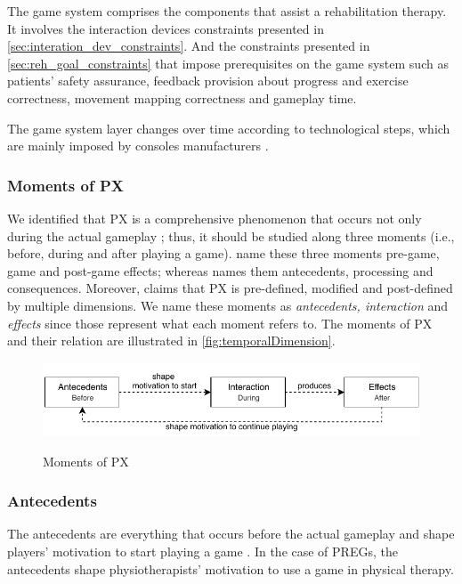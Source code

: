 The game system comprises the components that assist a rehabilitation therapy. It involves the interaction devices constraints presented in \autoref{sec:interation_dev_constraints}. And the constraints presented in \autoref{sec:reh_goal_constraints} that impose prerequisites on the game system such as patients' safety assurance, feedback provision about progress and exercise correctness, movement mapping correctness and gameplay time.

The game system layer changes over time according to technological steps, which are mainly imposed by consoles manufacturers \autocite{Nackea,Nackea2}.

\subsubsection{Moments of \ac{PX}}
We identified that \ac{PX} is a comprehensive phenomenon that occurs not only during the actual gameplay \autocite{Mayra}; thus, it should be studied along three moments \autocite{Elson2014,Fernandez2008,Nackea2,Nackea,Nacked} (i.e., before, during and after playing a game). \textcite{Elson2014} name these three moments pre-game, game and post-game effects; whereas \textcite{Fernandez2008} names them antecedents, processing and consequences. Moreover, \textcite{Mayra} claims that \ac{PX} is pre-defined, modified and post-defined by multiple dimensions. We name these moments as \textit{antecedents, interaction} and \textit{effects} since those represent what each moment refers to. The moments of \ac{PX} and their relation are illustrated in \autoref{fig:temporalDimension}.

\begin{figure}[bth]
\myfloatalign
{\includegraphics[width=.9\linewidth]{gfx/model/temporalDimension}} \quad
\caption{Moments of \ac{PX}}\label{fig:temporalDimension}
\end{figure}

\subsubsection*{Antecedents}
The antecedents are everything that occurs before the actual gameplay and shape players' motivation to start playing a game \autocite{Fernandez2008,Ferrara}. In the case of \acp{PREG}, the antecedents shape physiotherapists' motivation to use a game in physical therapy.

